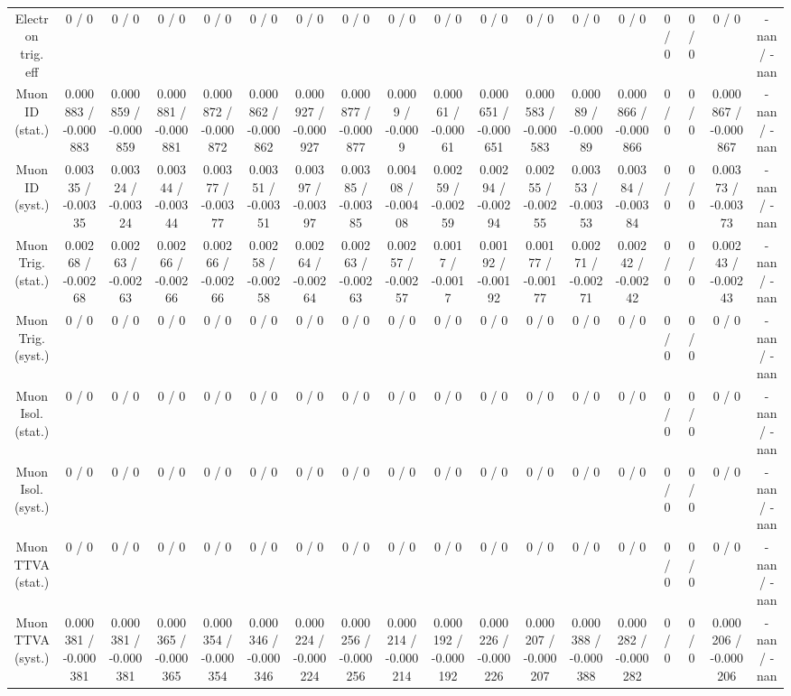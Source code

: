 \documentclass[10pt]{article}
\begin{document}
\begin{table}[htbp]
\begin{center}
\begin{tabular}{|c|c|c|c|c|c|c|c|c|c|c|c|c|c|c|c|c|c|}
  Electron trig. eff & 0 / 0 & 0 / 0 & 0 / 0 & 0 / 0 & 0 / 0 & 0 / 0 & 0 / 0 & 0 / 0 & 0 / 0 & 0 / 0 & 0 / 0 & 0 / 0 & 0 / 0 & 0 / 0 & 0 / 0 & 0 / 0 & -nan / -nan \\ 
  Muon ID (stat.) & 0.000883 / -0.000883 & 0.000859 / -0.000859 & 0.000881 / -0.000881 & 0.000872 / -0.000872 & 0.000862 / -0.000862 & 0.000927 / -0.000927 & 0.000877 / -0.000877 & 0.0009 / -0.0009 & 0.00061 / -0.00061 & 0.000651 / -0.000651 & 0.000583 / -0.000583 & 0.00089 / -0.00089 & 0.000866 / -0.000866 & 0 / 0 & 0 / 0 & 0.000867 / -0.000867 & -nan / -nan \\ 
  Muon ID (syst.) & 0.00335 / -0.00335 & 0.00324 / -0.00324 & 0.00344 / -0.00344 & 0.00377 / -0.00377 & 0.00351 / -0.00351 & 0.00397 / -0.00397 & 0.00385 / -0.00385 & 0.00408 / -0.00408 & 0.00259 / -0.00259 & 0.00294 / -0.00294 & 0.00255 / -0.00255 & 0.00353 / -0.00353 & 0.00384 / -0.00384 & 0 / 0 & 0 / 0 & 0.00373 / -0.00373 & -nan / -nan \\ 
  Muon Trig. (stat.) & 0.00268 / -0.00268 & 0.00263 / -0.00263 & 0.00266 / -0.00266 & 0.00266 / -0.00266 & 0.00258 / -0.00258 & 0.00264 / -0.00264 & 0.00263 / -0.00263 & 0.00257 / -0.00257 & 0.0017 / -0.0017 & 0.00192 / -0.00192 & 0.00177 / -0.00177 & 0.00271 / -0.00271 & 0.00242 / -0.00242 & 0 / 0 & 0 / 0 & 0.00243 / -0.00243 & -nan / -nan \\ 
  Muon Trig. (syst.) & 0 / 0 & 0 / 0 & 0 / 0 & 0 / 0 & 0 / 0 & 0 / 0 & 0 / 0 & 0 / 0 & 0 / 0 & 0 / 0 & 0 / 0 & 0 / 0 & 0 / 0 & 0 / 0 & 0 / 0 & 0 / 0 & -nan / -nan \\ 
  Muon Isol. (stat.) & 0 / 0 & 0 / 0 & 0 / 0 & 0 / 0 & 0 / 0 & 0 / 0 & 0 / 0 & 0 / 0 & 0 / 0 & 0 / 0 & 0 / 0 & 0 / 0 & 0 / 0 & 0 / 0 & 0 / 0 & 0 / 0 & -nan / -nan \\ 
  Muon Isol. (syst.) & 0 / 0 & 0 / 0 & 0 / 0 & 0 / 0 & 0 / 0 & 0 / 0 & 0 / 0 & 0 / 0 & 0 / 0 & 0 / 0 & 0 / 0 & 0 / 0 & 0 / 0 & 0 / 0 & 0 / 0 & 0 / 0 & -nan / -nan \\ 
  Muon TTVA (stat.) & 0 / 0 & 0 / 0 & 0 / 0 & 0 / 0 & 0 / 0 & 0 / 0 & 0 / 0 & 0 / 0 & 0 / 0 & 0 / 0 & 0 / 0 & 0 / 0 & 0 / 0 & 0 / 0 & 0 / 0 & 0 / 0 & -nan / -nan \\ 
  Muon TTVA (syst.) & 0.000381 / -0.000381 & 0.000381 / -0.000381 & 0.000365 / -0.000365 & 0.000354 / -0.000354 & 0.000346 / -0.000346 & 0.000224 / -0.000224 & 0.000256 / -0.000256 & 0.000214 / -0.000214 & 0.000192 / -0.000192 & 0.000226 / -0.000226 & 0.000207 / -0.000207 & 0.000388 / -0.000388 & 0.000282 / -0.000282 & 0 / 0 & 0 / 0 & 0.000206 / -0.000206 & -nan / -nan \\ 

\end{tabular}
\end{center}
\end{table}
\end{document}
